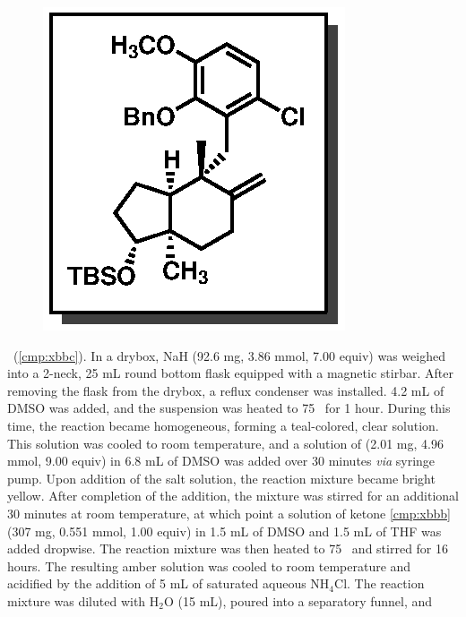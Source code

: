 \vspace{10pt}
\begin{figure}
  \vspace{-25pt}
  \begin{center}
    \includegraphics[scale=0.8]{chp_singlecarbon/images/xbbc}
  \end{center}
  \vspace{-30pt}
\end{figure}\noindent \textbf{\CMPxbbc}\ (\ref{cmp:xbbc}). In a drybox, NaH (92.6
mg, 3.86 mmol, 7.00 equiv) was weighed into a 2-neck, 25 mL round
bottom flask equipped with a magnetic stirbar. After removing the flask
from the drybox, a reflux condenser was installed. 4.2 mL of DMSO was
added, and the suspension was heated to 75 \degc\  for 1 hour. During this
time, the reaction became homogeneous, forming a teal-colored, clear solution. This solution was
cooled to room temperature, and a solution of  (2.01 mg, 4.96 mmol, 9.00 equiv) in 6.8
mL of DMSO was added over 30 minutes \textit{via} syringe pump. Upon addition of the salt solution,
the reaction mixture became bright yellow. After completion of the addition, the mixture was
stirred for an additional 30 minutes at room temperature, at which point a solution of ketone
\ref{cmp:xbbb} (307 mg, 0.551 mmol, 1.00 equiv) in 1.5 mL of DMSO and 1.5 mL of THF was added
dropwise.
The reaction mixture was then heated to 75 \degc\  and stirred for 16 hours. The resulting amber
solution was cooled to room temperature and acidified by the addition of 5 mL of saturated aqueous
NH$_4$Cl. The reaction mixture was diluted with H$_2$O (15 mL), poured into a separatory funnel, and
